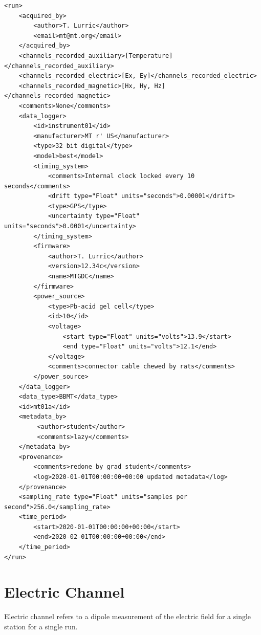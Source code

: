 \documentclass[12pt]{article}
\begin{document}
\begin{verbatim}
<run>
    <acquired_by>
        <author>T. Lurric</author>
        <email>mt@mt.org</email>
    </acquired_by>
    <channels_recorded_auxiliary>[Temperature]</channels_recorded_auxiliary>
    <channels_recorded_electric>[Ex, Ey]</channels_recorded_electric>
    <channels_recorded_magnetic>[Hx, Hy, Hz]</channels_recorded_magnetic>
    <comments>None</comments>
    <data_logger>
        <id>instrument01</id>
        <manufacturer>MT r' US</manufacturer>
        <type>32 bit digital</type>
        <model>best</model>
        <timing_system>
            <comments>Internal clock locked every 10 seconds</comments>
            <drift type="Float" units="seconds">0.00001</drift>
            <type>GPS</type>
            <uncertainty type="Float" units="seconds">0.0001</uncertainty>
        </timing_system>
        <firmware>
            <author>T. Lurric</author>
            <version>12.34c</version>
            <name>MTGDC</name>
        </firmware>
        <power_source>
            <type>Pb-acid gel cell</type>
            <id>10</id>
            <voltage>
                <start type="Float" units="volts">13.9</start>
                <end type="Float" units="volts">12.1</end>
            </voltage>
            <comments>connector cable chewed by rats</comments>
        </power_source>
    </data_logger>
    <data_type>BBMT</data_type>
    <id>mt01a</id>
    <metadata_by>
         <author>student</author>
         <comments>lazy</comments>
    </metadata_by>
    <provenance>
        <comments>redone by grad student</comments>
        <log>2020-01-01T00:00:00+00:00 updated metadata</log>
    </provenance>
    <sampling_rate type="Float" units="samples per second">256.0</sampling_rate>
    <time_period>
        <start>2020-01-01T00:00:00+00:00</start>
        <end>2020-02-01T00:00:00+00:00</end>
    </time_period>
</run>
\end{verbatim}


\newpage
\section{Electric Channel}

Electric channel refers to a dipole measurement of the electric field for a single station for a single run.  
\end{document}
